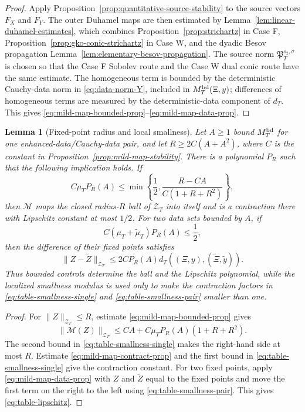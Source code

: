 \documentclass[10pt]{amsart}
\numberwithin{equation}{section}
\theoremstyle{plain}
\newtheorem{lemma}[theorem]{Lemma}
\theoremstyle{definition}
\theoremstyle{remark}
\newcommand{\calZ}{\mathcal{Z}}
\begin{document}
\begin{proof}
Apply Proposition~\ref{prop:quantitative-source-stability} to the source vectors $F_X$ and $F_Y$.  The outer Duhamel maps are then estimated by Lemma~\ref{lem:linear-duhamel-estimates}, which combines Proposition~\ref{prop:strichartz} in Case F, Proposition~\ref{prop:gko-conic-strichartz} in Case W, and the dyadic Besov propagation Lemma~\ref{lem:elementary-besov-propagation}.  The source norm $\mathfrak P_T^{s_2,\sigma}$ is chosen so that the Case F Sobolev route and the Case W dual conic route have the same estimate.  The homogeneous term is bounded by the deterministic Cauchy-data norm in \eqref{eq:data-norm-Y}, included in $M_T^{\rm bd}(\Xi,y)$; differences of homogeneous terms are measured by the deterministic-data component of $d_T$.  This gives \eqref{eq:mild-map-bounded-prop}--\eqref{eq:mild-map-data-prop}.
\end{proof}


\begin{lemma}[Fixed-point radius and local smallness]\label{lem:fixed-point-radius-table}
Let $A\ge1$ bound $M_T^{\rm bd}$ for one enhanced-data/Cauchy-data pair, and let $R\ge 2C(A+A^2)$, where $C$ is the constant in Proposition~\ref{prop:mild-map-stability}.  There is a polynomial $P_R$ such that the following implication holds.  If
\begin{equation}\label{eq:table-smallness-single}
        C\mu_T P_R(A)\le \min\left\{\frac12,\frac{R-C A}{C(1+R+R^2)}\right\},
\end{equation}
then $\mathcal M$ maps the closed radius-$R$ ball of $\calZ_T$ into itself and is a contraction there with Lipschitz constant at most $1/2$.  For two data sets bounded by $A$, if
\begin{equation}\label{eq:table-smallness-pair}
        C(\mu_T+\widetilde\mu_T)P_R(A)\le\frac12,
\end{equation}
then the difference of their fixed points satisfies
\begin{equation}\label{eq:table-lipschitz}
        \|Z-\widetilde Z\|_{\calZ_T}
        \le 2C P_R(A)d_T((\Xi,y),(\widetilde\Xi,\widetilde y)).
\end{equation}
Thus bounded controls determine the ball and the Lipschitz polynomial, while the localized smallness modulus is used only to make the contraction factors in \eqref{eq:table-smallness-single} and \eqref{eq:table-smallness-pair} smaller than one.
\end{lemma}

\begin{proof}
For $\|Z\|_{\calZ_T}\le R$, estimate \eqref{eq:mild-map-bounded-prop} gives
\[
        \|\mathcal M(Z)\|_{\calZ_T}
        \le C A+C\mu_TP_R(A)(1+R+R^2).
\]
The second bound in \eqref{eq:table-smallness-single} makes the right-hand side at most $R$.  Estimate \eqref{eq:mild-map-contract-prop} and the first bound in \eqref{eq:table-smallness-single} give the contraction constant.  For two fixed points, apply \eqref{eq:mild-map-data-prop} with $Z$ and $\widetilde Z$ equal to the fixed points and move the first term on the right to the left using \eqref{eq:table-smallness-pair}.  This gives \eqref{eq:table-lipschitz}.
\end{proof}
\end{document}
